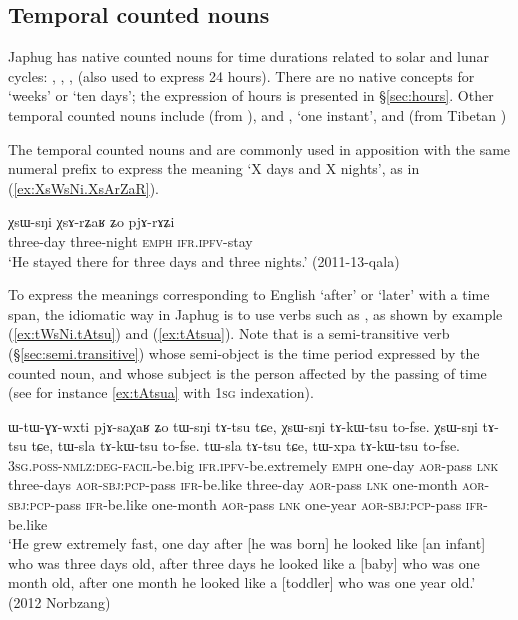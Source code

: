 \subsection{Temporal counted nouns} \label{sec:CN.time}
Japhug has native counted nouns for time durations related to solar and lunar cycles: , , ,  (also used to express 24 hours). There are no native concepts for `weeks' or `ten days'; the expression of hours is presented in §\ref{sec:hours}. Other temporal counted nouns include  (from ),  and , `one instant', and  (from Tibetan )


The temporal counted nouns   and  are commonly used in apposition with the same numeral prefix to express the meaning `X days and X nights', as in (\ref{ex:XsWsNi.XsArZaR}).

\begin{exe}
\ex \label{ex:XsWsNi.XsArZaR}
\gll χsɯ-sŋi χsɤ-rʑaʁ ʑo pjɤ-rɤʑi \\
three-day three-night \textsc{emph} \textsc{ifr}.\textsc{ipfv}-stay \\
\glt `He stayed there for three days and three nights.' (2011-13-qala)
\end{exe}  

To express the meanings corresponding to English `after' or `later' with a time span, the idiomatic way in Japhug is to use verbs such as , as shown by example (\ref{ex:tWsNi.tAtsu}) and (\ref{ex:tAtsua}). Note that  is a semi-transitive verb (§\ref{sec:semi.transitive}) whose semi-object is the time period expressed by the counted noun, and whose subject is the person affected by the passing of time (see for instance \ref{ex:tAtsua} with \textsc{1sg} indexation).

\begin{exe}
\ex \label{ex:tWsNi.tAtsu}
\gll ɯ-tɯ-ɣɤ-wxti pjɤ-saχaʁ ʑo tɯ-sŋi tɤ-tsu tɕe, χsɯ-sŋi tɤ-kɯ-tsu to-fse. χsɯ-sŋi tɤ-tsu tɕe, tɯ-sla tɤ-kɯ-tsu to-fse. tɯ-sla tɤ-tsu tɕe, tɯ-xpa tɤ-kɯ-tsu to-fse. \\
\textsc{3sg}.\textsc{poss}-\textsc{nmlz}:\textsc{deg}-\textsc{facil}-be.big \textsc{ifr}.\textsc{ipfv}-be.extremely \textsc{emph} one-day \textsc{aor}-pass \textsc{lnk} three-days \textsc{aor}-\textsc{sbj}:\textsc{pcp}-pass \textsc{ifr}-be.like three-day \textsc{aor}-pass \textsc{lnk} one-month \textsc{aor}-\textsc{sbj}:\textsc{pcp}-pass \textsc{ifr}-be.like one-month \textsc{aor}-pass \textsc{lnk} one-year \textsc{aor}-\textsc{sbj}:\textsc{pcp}-pass \textsc{ifr}-be.like  \\
\glt `He grew extremely fast, one day after [he was born] he looked like [an infant] who was three days old, after three days he looked like a [baby] who was one month old, after one month he looked like a [toddler] who was one year old.' (2012 Norbzang)
\end{exe}


